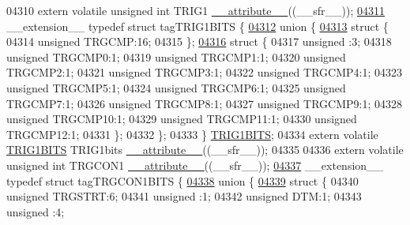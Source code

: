 \begin{DoxyCode}
04310 \textcolor{keyword}{extern} \textcolor{keyword}{volatile} \textcolor{keywordtype}{unsigned} \textcolor{keywordtype}{int}  TRIG1 \hyperlink{a00015_a493c46f03454991ccc5aa7a6e1dfb2a7}{\_\_attribute\_\_}((\_\_sfr\_\_));
\hypertarget{a00015_source_l04311}{}\hyperlink{a00014}{04311} \_\_extension\_\_ \textcolor{keyword}{typedef} \textcolor{keyword}{struct }tagTRIG1BITS \{
\hypertarget{a00015_source_l04312}{}\hyperlink{a00015}{04312}   \textcolor{keyword}{union }\{
\hypertarget{a00015_source_l04313}{}\hyperlink{a00015}{04313}     \textcolor{keyword}{struct }\{
04314       \textcolor{keywordtype}{unsigned} TRGCMP:16;
04315     \};
\hypertarget{a00015_source_l04316}{}\hyperlink{a00015}{04316}     \textcolor{keyword}{struct }\{
04317       \textcolor{keywordtype}{unsigned} :3;
04318       \textcolor{keywordtype}{unsigned} TRGCMP0:1;
04319       \textcolor{keywordtype}{unsigned} TRGCMP1:1;
04320       \textcolor{keywordtype}{unsigned} TRGCMP2:1;
04321       \textcolor{keywordtype}{unsigned} TRGCMP3:1;
04322       \textcolor{keywordtype}{unsigned} TRGCMP4:1;
04323       \textcolor{keywordtype}{unsigned} TRGCMP5:1;
04324       \textcolor{keywordtype}{unsigned} TRGCMP6:1;
04325       \textcolor{keywordtype}{unsigned} TRGCMP7:1;
04326       \textcolor{keywordtype}{unsigned} TRGCMP8:1;
04327       \textcolor{keywordtype}{unsigned} TRGCMP9:1;
04328       \textcolor{keywordtype}{unsigned} TRGCMP10:1;
04329       \textcolor{keywordtype}{unsigned} TRGCMP11:1;
04330       \textcolor{keywordtype}{unsigned} TRGCMP12:1;
04331     \};
04332   \};
04333 \} \hyperlink{a00014_d7/d4f/a00819}{TRIG1BITS};
04334 \textcolor{keyword}{extern} \textcolor{keyword}{volatile} \hyperlink{a00014_d7/d4f/a00819}{TRIG1BITS} TRIG1bits \hyperlink{a00015_a493c46f03454991ccc5aa7a6e1dfb2a7}{\_\_attribute\_\_}((\_\_sfr\_\_));
04335 
04336 \textcolor{keyword}{extern} \textcolor{keyword}{volatile} \textcolor{keywordtype}{unsigned} \textcolor{keywordtype}{int}  TRGCON1 \hyperlink{a00015_a493c46f03454991ccc5aa7a6e1dfb2a7}{\_\_attribute\_\_}((\_\_sfr\_\_));
\hypertarget{a00015_source_l04337}{}\hyperlink{a00014}{04337} \_\_extension\_\_ \textcolor{keyword}{typedef} \textcolor{keyword}{struct }tagTRGCON1BITS \{
\hypertarget{a00015_source_l04338}{}\hyperlink{a00015}{04338}   \textcolor{keyword}{union }\{
\hypertarget{a00015_source_l04339}{}\hyperlink{a00015}{04339}     \textcolor{keyword}{struct }\{
04340       \textcolor{keywordtype}{unsigned} TRGSTRT:6;
04341       \textcolor{keywordtype}{unsigned} :1;
04342       \textcolor{keywordtype}{unsigned} DTM:1;
04343       \textcolor{keywordtype}{unsigned} :4;

\end{DoxyCode}
